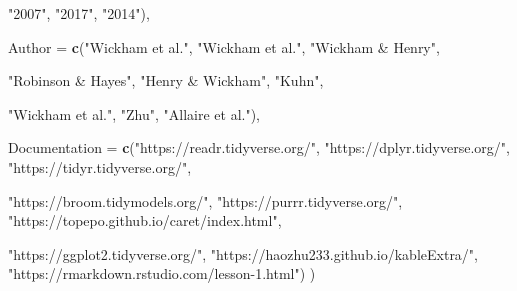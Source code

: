 \documentclass[10pt,letterpaper]{article}
\newenvironment{Shaded}{\begin{snugshade}}{\end{snugshade}}
\newcommand{\DataTypeTok}[1]{\textcolor[rgb]{0.13,0.29,0.53}{#1}}
\newcommand{\KeywordTok}[1]{\textcolor[rgb]{0.13,0.29,0.53}{\textbf{#1}}}
\newcommand{\NormalTok}[1]{#1}
\newcommand{\StringTok}[1]{\textcolor[rgb]{0.31,0.60,0.02}{#1}}
\begin{document}
\begin{Shaded}
\begin{Highlighting}[]
           \StringTok{"2007"}\NormalTok{,}
           \StringTok{"2017"}\NormalTok{, }
           \StringTok{"2014"}\NormalTok{),}
  
  \DataTypeTok{Author =} \KeywordTok{c}\NormalTok{(}\StringTok{"Wickham et al."}\NormalTok{,}
             \StringTok{"Wickham et al."}\NormalTok{, }
             \StringTok{"Wickham & Henry"}\NormalTok{,}
  
             \StringTok{"Robinson & Hayes"}\NormalTok{,}
             \StringTok{"Henry & Wickham"}\NormalTok{,}
             \StringTok{"Kuhn"}\NormalTok{, }
                    
             \StringTok{"Wickham et al."}\NormalTok{,}
             \StringTok{"Zhu"}\NormalTok{, }
             \StringTok{"Allaire et al."}\NormalTok{),}
  
  \DataTypeTok{Documentation =} \KeywordTok{c}\NormalTok{(}\StringTok{"https://readr.tidyverse.org/"}\NormalTok{, }
                    \StringTok{"https://dplyr.tidyverse.org/"}\NormalTok{, }
                    \StringTok{"https://tidyr.tidyverse.org/"}\NormalTok{,}
  
                    \StringTok{"https://broom.tidymodels.org/"}\NormalTok{,}
                    \StringTok{"https://purrr.tidyverse.org/"}\NormalTok{,}
                    \StringTok{"https://topepo.github.io/caret/index.html"}\NormalTok{, }
                    
                    \StringTok{"https://ggplot2.tidyverse.org/"}\NormalTok{,}
                    \StringTok{"https://haozhu233.github.io/kableExtra/"}\NormalTok{, }
                    \StringTok{"https://rmarkdown.rstudio.com/lesson-1.html"}\NormalTok{)}
\NormalTok{)}
\end{Highlighting}
\end{Shaded}
\end{document}
